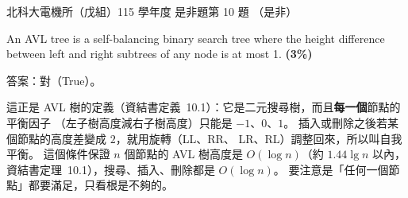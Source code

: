 \begin{pastexam}[label={px:ntut-115-ee-ds-10}]{北科大電機所（戊組）115 學年度 是非題第 10 題}
（是非）

An AVL tree is a self-balancing binary search tree where the height difference between left and right
subtrees of any node is at most 1. \textbf{(3\%)}
\end{pastexam}

\begin{pastsoln}
答案：對（True）。

這正是 AVL 樹的定義（資結書定義~10.1）：它是二元搜尋樹，而且\textbf{每一個}節點的平衡因子
（左子樹高度減右子樹高度）只能是 $-1$、$0$、$1$。 插入或刪除之後若某個節點的高度差變成 $2$，就用旋轉（LL、RR、
LR、RL）調整回來，所以叫自我平衡。 這個條件保證 $n$ 個節點的 AVL 樹高度是 $O(\log n)$（約 $1.44 \lg n$ 以內，
資結書定理~10.1），搜尋、插入、刪除都是 $O(\log n)$。 要注意是「任何一個節點」都要滿足，只看根是不夠的。
\end{pastsoln}
